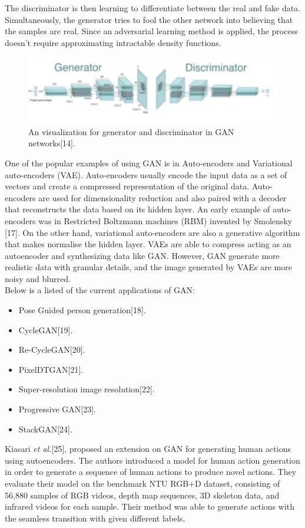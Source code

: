 \hspace{5mm} The discriminator is then learning to differentiate between the real and fake data. Simultaneously, the generator tries to fool the other network into believing that the samples are real. Since an adversarial learning method is applied, the process doesn't require approximating intractable density functions.\\
\begin{figure}[ht]
\centering
\includegraphics{Figures/gan}
\decoRule
\caption[An visualization for generator and discriminator in GAN networks "14".]{An visualization for generator and discriminator in GAN networks[14].}
\label{fig:la}
\end{figure}
One of the popular examples of using GAN is in Auto-encoders and Variational auto-encoders (VAE). Auto-encoders usually encode the input data as a set of vectors and create a compressed representation of the original data. Auto-encoders are used for dimensionality reduction and also paired with a decoder that reconstructs the data based on its hidden layer. An early example of auto-encoders was in Restricted Boltzmann machines (RBM) invented by Smolensky [17]. On the other hand, variational auto-encoders are also a generative algorithm that makes normalise the hidden layer. VAEs are able to compress acting as an autoencoder and synthesizing data like GAN. However, GAN generate more realistic data with granular details, and the image generated by VAEs are more noisy and blurred.\\
\hspace{5mm} Below is a listed of the current applications of GAN:
\begin{itemize}
    \item Pose Guided person generation[18].
    \item CycleGAN[19].
    \item Re-CycleGAN[20].
    \item PixelDTGAN[21].
    \item Super-resolution image resolution[22].
    \item Progressive GAN[23].
    \item StackGAN[24].
\end{itemize}
\hspace{5mm} Kiasari \textit{et al.}[25], proposed an extension on GAN for generating human actions using autoencoders. The authors introduced a model for human action generation in order to generate a sequence of human actions to produce novel actions. They evaluate their model on the benchmark NTU RGB+D dataset, consisting of 56,880 samples of RGB videos, depth map sequences, 3D skeleton data, and infrared videos for each sample. Their method was able to generate actions with the seamless transition with given different labels.
